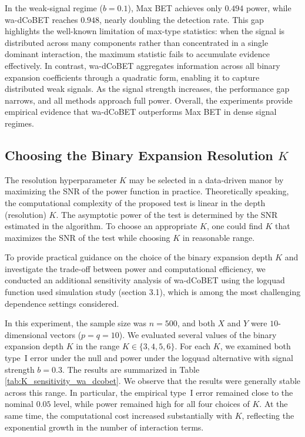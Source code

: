 \documentclass[12pt,reqno,oneside]{amsbook}
\theoremstyle{definition}
\theoremstyle{remark}
\begin{document}
In the weak-signal regime ($b=0.1$), Max BET achieves only $0.494$ power, while wa-dCoBET reaches $0.948$, nearly doubling the detection rate. This gap highlights the well-known limitation of max-type statistics: when the signal is distributed across many components rather than concentrated in a single dominant interaction, the maximum statistic fails to accumulate evidence effectively. In contrast, wa-dCoBET aggregates information across all binary expansion coefficients through a quadratic form, enabling it to capture distributed weak signals. As the signal strength increases, the performance gap narrows, and all methods approach full power. Overall, the experiments provide empirical evidence that wa-dCoBET outperforms Max BET in dense signal regimes.


\subsection{ Choosing the Binary Expansion Resolution $K$}
\label{choose_k}
 The resolution hyperparameter $K$ may be selected in a data-driven manor by maximizing the SNR of the power function in practice. Theoretically speaking, the computational complexity of the proposed test is linear in the depth (resolution) $K$. The asymptotic power of the test is determined by the SNR estimated
in the algorithm. To choose an appropriate $K$, one could find $K$ that maximizes the SNR of the test while choosing $K$ in 
reasonable range.

To provide practical guidance on the choice of the binary expansion depth $K$ and investigate the trade-off between power and computational efficiency, we conducted an additional sensitivity analysis of wa-dCoBET using the logquad function used simulation study (section 3.1), which is among the most challenging dependence settings considered. 


In this experiment, the sample size was $n=500$, and both $X$ and $Y$ were $10$-dimensional vectors ($p=q=10$). We evaluated several values of the binary expansion depth $K$ in the range $K \in \{3,4,5,6\}$. For each $K$, we examined both type~I error under the null and power under the logquad alternative with signal strength $b=0.3$. The results are summarized in Table \ref{tab:K_sensitivity_wa_dcobet}. We observe that the results were generally stable across this range. In particular, the empirical type~I error remained close to the nominal $0.05$ level, while power remained high for all four choices of $K$. At the same time, the computational cost increased substantially with $K$, reflecting the exponential growth in the number of interaction terms.
\end{document}
